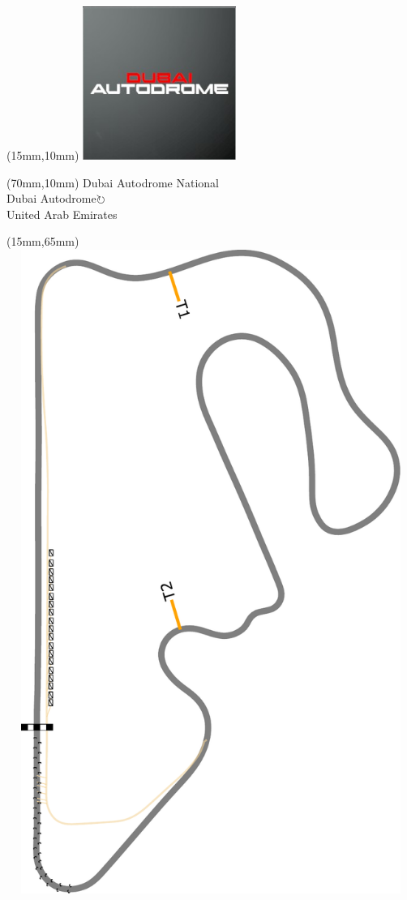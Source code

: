 \null\newpage
\begin{textblock*}{50mm}(15mm,10mm)%
\includegraphics[width=50mm]{LG/2015-05-20_00081.png}
\end{textblock*}
\begin{textblock*}{130mm}(70mm,10mm)%
{\fontsize{20}{20}\selectfont Dubai Autodrome National\\}
{\fontsize{16}{16}\selectfont Dubai Autodrome\hfill \Large$\circlearrowright$\\}
{\fontsize{12}{12}\selectfont United Arab Emirates\\}
\end{textblock*}
\begin{textblock*}{185mm}(15mm,65mm)%
\centering
\mbox{\includegraphics[width=185mm,height=210mm,keepaspectratio]{PT/DUAUNA.pdf}}
\end{textblock*}
